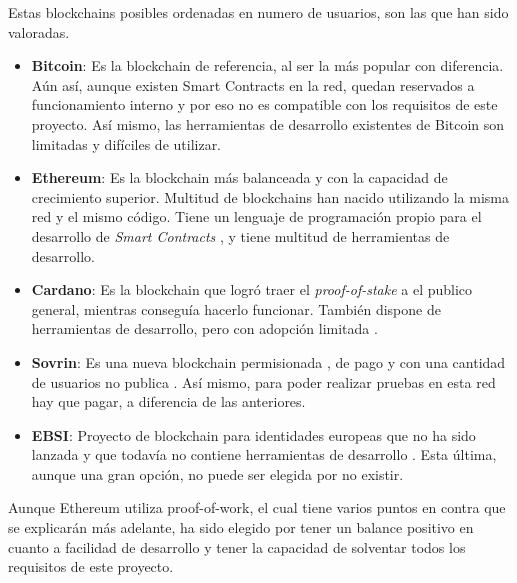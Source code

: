 Estas blockchains posibles ordenadas en numero de usuarios, son las que han sido valoradas.
\begin{itemize}
    \item \textbf{Bitcoin}: Es la blockchain de referencia, al ser la más popular con diferencia. Aún así, aunque existen Smart Contracts en la red, quedan reservados a funcionamiento interno y por eso no es compatible con los requisitos de este proyecto. Así mismo, las herramientas de desarrollo existentes de Bitcoin son limitadas y difíciles de utilizar.
    \item \textbf{Ethereum}: Es la blockchain más balanceada y con la capacidad de crecimiento superior. Multitud de blockchains han nacido utilizando la misma red y el mismo código. Tiene un lenguaje de programación propio para el desarrollo de \textit{Smart Contracts} \cite{web:solidity}, y tiene multitud \cite{web:ganache} \cite{web:hardhat} de herramientas de desarrollo.
    \item \textbf{Cardano}: Es la blockchain que logró traer el \textit{proof-of-stake} \cite{web:pos} a el publico general, mientras conseguía hacerlo funcionar. También dispone de herramientas de desarrollo, pero con adopción limitada \cite{web:cardano_dev}.
    \item \textbf{Sovrin}: Es una nueva blockchain permisionada \cite{web:perm}, de pago y con una cantidad de usuarios no publica \cite{web:sovrin}. Así mismo, para poder realizar pruebas en esta red hay que pagar, a diferencia de las anteriores.
    \item \textbf{EBSI}: Proyecto de blockchain para identidades europeas que no ha sido lanzada y que todavía no contiene herramientas de desarrollo \cite{web:EBSI}. Esta última, aunque una gran opción, no puede ser elegida por no existir.
\end{itemize}
Aunque Ethereum utiliza proof-of-work, el cual tiene varios puntos en contra que se explicarán más adelante, ha sido elegido por tener un balance positivo en cuanto a facilidad de desarrollo y tener la capacidad de solventar todos los requisitos de este proyecto.

